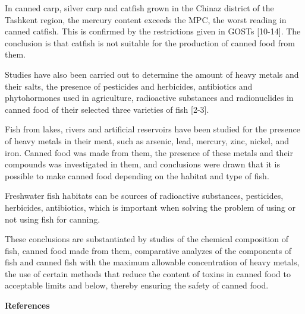 \begin{multicols}{2}
In canned carp, silver carp and catfish grown in the Chinaz district of
the Tashkent region, the mercury content exceeds the MPC, the worst
reading in canned catfish. This is confirmed by the restrictions given
in GOSTs {[}10-14{]}. The conclusion is that catfish is not suitable for
the production of canned food from them.

Studies have also been carried out to determine the amount of heavy
metals and their salts, the presence of pesticides and herbicides,
antibiotics and phytohormones used in agriculture, radioactive
substances and radionuclides in canned food of their selected three
varieties of fish {[}2-3{]}.

Fish from lakes, rivers and artificial reservoirs have been studied for
the presence of heavy metals in their meat, such as arsenic, lead,
mercury, zinc, nickel, and iron. Canned food was made from them, the
presence of these metals and their compounds was investigated in them,
and conclusions were drawn that it is possible to make canned food
depending on the habitat and type of fish.

Freshwater fish habitats can be sources of radioactive substances,
pesticides, herbicides, antibiotics, which is important when solving the
problem of using or not using fish for canning.

These conclusions are substantiated by studies of the chemical
composition of fish, canned food made from them, comparative analyzes of
the components of fish and canned fish with the maximum allowable
concentration of heavy metals, the use of certain methods that reduce
the content of toxins in canned food to acceptable limits and below,
thereby ensuring the safety of canned food.
\end{multicols}

\begin{center}
{\bfseries References}
\end{center}

